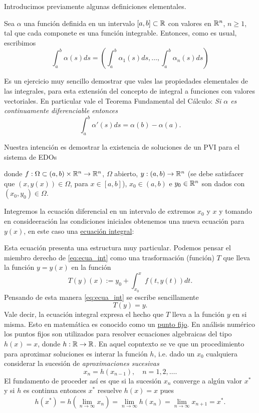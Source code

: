 Introducimos previamente algunas definiciones elementales.

\begin{definicion}
 Sea $\alpha$ una función  definida en un intervalo $[a,b]\subset \mathbb{R}$ con valores en $\mathbb{R}^n$, $n\geq 1$, tal que cada componete es una función integrable. Entonces, como es usual, escribimos
 \[\int_a^b\alpha(s)ds=\left(\int_a^b\alpha_1(s)ds,\ldots,\int_a^b\alpha_n(s)ds\right) \]
\end{definicion}

Es un ejercicio muy sencillo \actividad demostrar que vales las propiedades elementales de las integrales, para esta extensión del concepto de integral a funciones con valores vectoriales. En particular vale el Teorema Fundamental del Cálculo: \emph{Si $\alpha$ es continuamente diferenciable entonces
\[ \int_a^b\alpha'(s)ds=\alpha(b)-\alpha(a).\]
}

Nuestra intención es demostrar la existencia de soluciones de un PVI para el sistema de EDOs

donde $f:\Omega \subset (a,b)\times \mathbb{R}^n\to \mathbb{R}^n$, $\Omega$ abierto, $y:(a,b)\to \mathbb{R}^n$ (se debe satisfacer que $(x,y(x))\in \Omega$, para $x\in [a,b]$), $x_0\in (a,b)$
e $y_0\in\mathbb{R}^n$ son dados con $(x_0,y_0)\in \Omega$.



Integremos la ecuación diferencial en un intervalo de extremos $x_0$ y $x$ y tomando en consideeración las condiciones iniciales obtenemos una nueva ecuación para $y(x)$,  en este caso una \href{https://es.wikipedia.org/wiki/Ecuaci%C3%B3n_integral}{ecuación integral}\link :


Esta ecuación presenta una estructura muy particular. Podemos pensar el miembro derecho de \eqref{eq:ecua_int} como una trasformación (función) $T$ que lleva la función $y=y(x)$ en la función
\[
 T(y)(x):=y_0+\int_{x_0}^xf(t,y(t))dt.
\]
Pensando de esta manera  \eqref{eq:ecua_int} se escribe sencillamente
\[
 T(y)=y.
\]
Vale decir, la ecuación integral expresa el hecho que $T$ lleva a la función $y$ en si misma. Esto en matemática es conocido como un \href{https://es.wikipedia.org/wiki/M%C3%A9todo_del_punto_fijo}{punto fijo}\link. En análisis numérico los puntos fijos son utilizados para resolver ecuaciones algebraicas del tipo $h(x)=x$, donde $h:\mathbb{R}\to\mathbb{R}$. En aquel copntexto se ve que un procedimiento para aproximar soluciones es interar la función $h$, i.e. dado un $x_0$ cualquiera considerar la sucesión de \emph{aproximaciones sucesivas}
\[x_n=h(x_{n-1}),\quad n=1,2,\ldots.\]
El fundamento de proceder así es que si la sucesión $x_n$ converge a algún valor $x^*$ y si $h$ es continua entonces $x^*$ resuelve $h(x)=x$ pues
\begin{equation}
\label{eq:pto_fijo}h(x^*)=h\left(\lim_{n\to\infty} x_n\right)=\lim_{n\to\infty} h(x_n)=\lim_{n\to\infty} x_{n+1}=x^*.
\end{equation}

